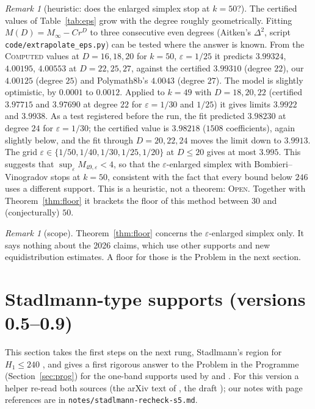 \documentclass[11pt]{amsart}
\theoremstyle{definition}
\theoremstyle{remark}
\newtheorem{remark}[theorem]{Remark}
\newcommand{\lbl}[1]{\textup{\textsc{#1}}}
\begin{document}
\begin{remark}[heuristic: does the enlarged simplex stop at $k=50$?]\label{rem:k49}
The certified values of Table~\ref{tab:eps} grow with the degree roughly
geometrically. Fitting $M(D)=M_\infty-Cr^{D}$ to three consecutive even
degrees (Aitken's $\Delta^2$, script \texttt{code/extrapolate\_eps.py}) can
be tested where the answer is known. From the \lbl{Computed} values at $D=16,18,20$ for $k=50$,
$\varepsilon=1/25$ it predicts $3.99324$, $4.00195$, $4.00553$ at $D=22,25,27$,
against the certified $3.99310$ (degree $22$), our $4.00125$ (degree $25$)
and Polymath8b's $4.0043$ (degree $27$). The model is slightly optimistic, by
$0.0001$ to $0.0012$. Applied to $k=49$ with $D=18,20,22$ (certified
$3.97715$ and $3.97690$ at degree $22$ for $\varepsilon=1/30$ and $1/25$) it
gives limits $3.9922$ and $3.9938$. As a test registered before the run, the
fit predicted $3.98230$ at degree $24$ for $\varepsilon=1/30$; the certified
value is $3.98218$ ($1508$ coefficients), again slightly below, and the fit
through $D=20,22,24$ moves the limit down to $3.9913$. The grid
$\varepsilon\in\{1/50,1/40,1/30,1/25,1/20\}$ at $D\le20$ gives at most
$3.995$. This suggests that $\sup_\varepsilon M_{49,\varepsilon}<4$, so that
the $\varepsilon$-enlarged simplex with Bombieri--Vinogradov stops at $k=50$,
consistent with the fact that every bound below $246$ uses a different support.
This is a heuristic, not a theorem: \lbl{Open}. Together with
Theorem~\ref{thm:floor} it brackets the floor of this method between $30$ and
(conjecturally) $50$.
\end{remark}

\begin{remark}[scope]
Theorem~\ref{thm:floor} concerns the $\varepsilon$-enlarged simplex only. It
says nothing about the 2026 claims, which use other supports and new
equidistribution estimates. A floor for those is the Problem in the next
section.
\end{remark}

\section{Stadlmann-type supports (versions 0.5--0.9)}\label{sec:stad}

This section takes the first steps on the next rung, Stadlmann's region for
$H_1\le240$ \cite{Sta26}, and gives a first rigorous answer to the Problem in
the Programme (Section~\ref{sec:prog}) for the one-band supports used by \cite{Sta26} and \cite{Cha26}.
For this version a helper re-read both sources (the arXiv text of
\cite{Sta26}, the draft \cite{Cha26}); our notes with page references are in
\texttt{notes/stadlmann-recheck-s5.md}.
\end{document}

